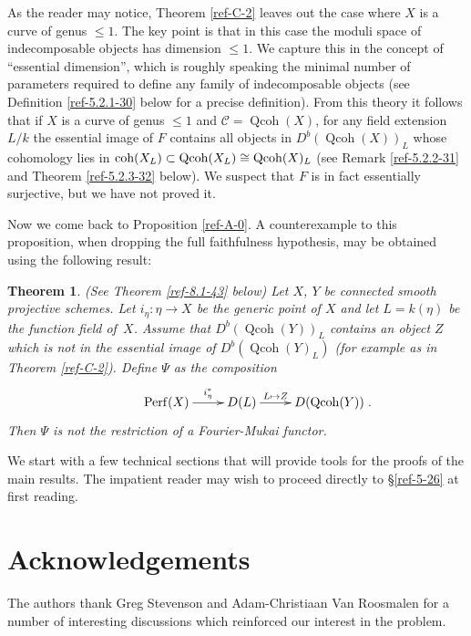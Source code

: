 \documentclass{amsart}
\numberwithin{equation}{section}
\let\cal\mathcal
\newtheorem{theorem}[lemma]{Theorem}
\theoremstyle{definition}
\theoremstyle{remark}
\begin{document}
\medskip

As the reader may notice, Theorem \ref{ref-C-2} leaves out the case where $X$ is
a curve of genus $\le 1$.  
The key point is that in this case the 
moduli space of indecomposable objects has dimension  $\le 1$. We capture this in the concept of ``essential dimension'', which is
roughly speaking the minimal number of parameters required to define any family of indecomposable objects (see
Definition \ref{ref-5.2.1-30} below for a precise definition). 
From this theory it follows that if $X$ is a curve of genus $\le 1$ and ${{\cal C}}={\operatorname{Qcoh}}(X)$, for any field extension $L/k$ the essential image 
of 
$F$ contains all objects in $D^b({\operatorname{Qcoh}}(X))_L$ whose cohomology lies in ${\mathop{\text{\upshape{coh}}}}(X_L)\subset {\operatorname{Qcoh}}(X_L)\cong {\operatorname{Qcoh}}(X)_L$
(see Remark \ref{ref-5.2.2-31} and Theorem \ref{ref-5.2.3-32} below).
 We suspect that $F$ is in fact essentially surjective, but we have not proved it. 

\medskip

Now we come back to Proposition \ref{ref-A-0}. A counterexample to this proposition,
when dropping the full faithfulness hypothesis, may be obtained using the following result:
{
\begin{theorem} (See Theorem \ref{ref-8.1-43} below)
Let $X$, $Y$ be connected smooth
projective schemes. Let $i_\eta:\eta{\rightarrow} X$ be the generic point of $X$ and let
$L=k(\eta)$ be the function field of~$X$. Assume that
$D^b({\operatorname{Qcoh}}(Y))_L$ contains an object $Z$ which is not in the essential
image of $D^b({\operatorname{Qcoh}}(Y)_L)$ (for example as in Theorem \ref{ref-C-2}). Define  $\Psi$ as the 
composition
\[
\xymatrix{
& {\operatorname{Perf}}(X) \ar[r]^-{i^*_{\eta}} &  D(L) \ar[r]^-{L\mapsto Z} & D({\operatorname{Qcoh}}(Y))
}.
\]
Then $\Psi$ is not the restriction of a Fourier-Mukai functor.
\end{theorem}
}

\bigskip

We start with a few technical sections that will provide tools for the proofs of the main results. The
impatient reader may wish to  proceed directly to \S\ref{ref-5-26} at first reading.
\section{Acknowledgements}
The authors thank Greg Stevenson and Adam-Christiaan Van Roosmalen for
a number of interesting discussions which reinforced our interest in the
problem.
\end{document}
